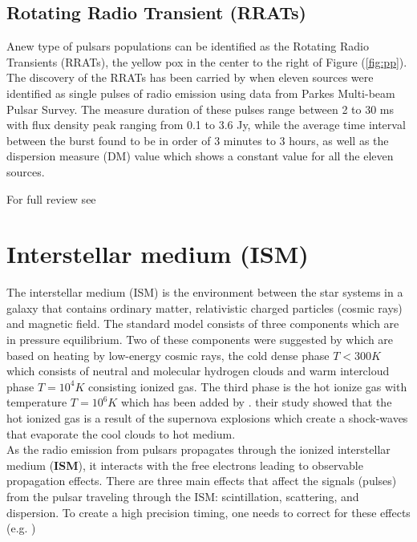 \subsection{Rotating Radio Transient (RRATs)}
Anew type of pulsars populations can be identified as the Rotating Radio Transients (RRATs), the yellow pox in the center to the right of Figure (\ref{fig:pp}). The discovery of the RRATs has been carried by \cite{mclaughlin2006transient} when eleven sources were identified as single pulses of radio emission using data from Parkes Multi-beam Pulsar Survey. The measure duration of these pulses range between 2 to 30 ms with flux density peak ranging from 0.1 to 3.6 Jy, while the average time interval between the burst found to be in order of 3 minutes to 3 hours, as well as the dispersion measure (DM) value which shows a constant value for all the eleven sources.



For full review see \citet{2010PhDT.......460K}








\section{Interstellar medium (ISM)} %
\label{ISM}


The interstellar medium (ISM) is the environment between the star systems in a galaxy that contains ordinary matter, relativistic charged particles (cosmic rays) and magnetic field. The standard model consists of three components which are in pressure equilibrium. Two of these components were suggested by \citet{field1969cosmic} which are based on heating by low-energy cosmic rays, the cold dense phase $T < 300 K$ which consists of neutral and molecular hydrogen clouds and warm intercloud phase $T = 10^{4} K$ consisting ionized gas. The third phase is the hot ionize gas with temperature  $T = 10^{6} K$  which has been added by \citet{mckee1977theory}. their study showed that the hot ionized gas is a result of the supernova explosions which create a shock-waves that evaporate the cool clouds to hot medium.\\
As the radio emission from pulsars propagates through the ionized interstellar medium (\textbf{ISM}), it interacts with the free electrons leading to observable propagation effects. There are three main effects that affect the signals (pulses) from the pulsar traveling through the ISM: scintillation, scattering, and dispersion. To create a high precision timing, one needs to correct for these effects (e.g. \citet{armstrong1995electron})





